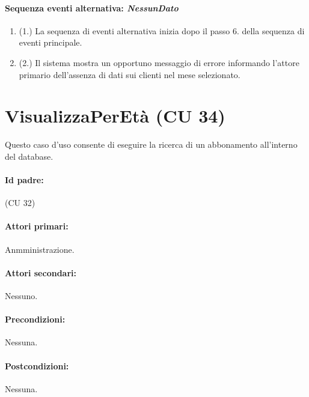 \documentclass{article}
\begin{document}
		\paragraph{Sequenza eventi alternativa: \textit{NessunDato}}
	\begin{enumerate}	[leftmargin=28pt]
			\item  (1.) La sequenza di eventi alternativa inizia dopo il passo 6. della sequenza di eventi principale.
			\item  (2.) Il sistema mostra un opportuno messaggio di errore informando l'attore primario dell'assenza di dati sui clienti nel mese selezionato.
		\end{enumerate}
	
	




\newpage	
\section*{VisualizzaPerEtà (CU 34)}
	
	Questo caso d'uso consente di eseguire la ricerca di un abbonamento all'interno del database.
	
	\paragraph{Id padre:} (CU 32)
	
	\paragraph{Attori primari:}Anmministrazione.
	    
	\paragraph{Attori secondari:}Nessuno.
	
	\paragraph{Precondizioni:}Nessuna.
	
	\paragraph{Postcondizioni:}Nessuna.
	
\end{document}
